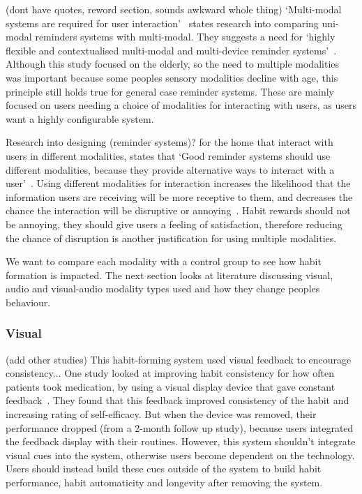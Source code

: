 \documentclass{scaffold/sigchi}
\begin{document}
(dont have quotes, reword section, sounds awkward whole thing) `Multi-modal systems are required for user interaction'~\cite{article_user_centred_multimodal_reminders} states research into comparing uni-modal reminders systems with multi-modal.
They suggests a need for `highly flexible and contextualised multi-modal and multi-device reminder systems'~\cite{article_user_centred_multimodal_reminders}.
Although this study focused on the elderly, so the need to multiple modalities was important because some peoples sensory modalities decline with age,
this principle still holds true for general case reminder systems. These are mainly focused on users needing a choice of modalities for interacting with users, as users want a highly configurable system.

Research into designing (reminder systems)? for the home that interact with users in different modalities, states that
`Good reminder systems should use different modalities, because they provide alternative ways to interact with a user'~\cite{article_designing_multimodal_reminders_for_home}.
Using different modalities for interaction increases the likelihood that the information users are receiving will be more receptive to them,
and decreases the chance the interaction will be disruptive or annoying~\cite{article_designing_multimodal_reminders_for_home}.
Habit rewards should not be annoying, they should give users a feeling of satisfaction, therefore reducing the chance of disruption is another justification for using multiple modalities.

We want to compare each modality with a control group to see how habit formation is impacted. The next section looks at literature discussing visual, audio and visual-audio modality types used and how they change peoples behaviour.

\subsubsection{Visual}
(add other studies)
This habit-forming system used visual feedback to encourage consistency...
One study looked at improving habit consistency for how often patients took medication,
by using a visual display device that gave constant feedback~\cite{article_realtime_feedback_improving_medication_taking}.
They found that this feedback improved consistency of the habit and increasing rating of self-efficacy.
But when the device was removed, their performance dropped (from a 2-month follow up study), because users integrated the feedback display with their routines.
However, this system shouldn't integrate visual cues into the system, otherwise users become dependent on the technology.
Users should instead build these cues outside of the system to build habit performance, habit automaticity and longevity after removing the system.
\end{document}
